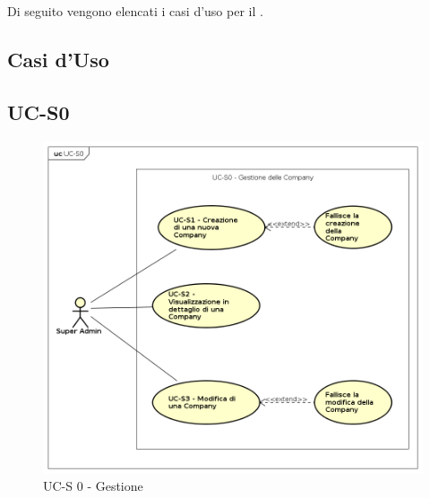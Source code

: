 \section{}

Di seguito vengono elencati i casi d'uso per il .

\newpage

\subsection{Casi d'Uso}

\subsection{UC-S0}

    \begin{figure}[h]
      \begin{center}
        \includegraphics[width=12cm]{res/img/UCSuperadmin/UC-S0.png}
      \caption{UC-S 0 - Gestione }
      \end{center} 
    \end{figure}    
    
